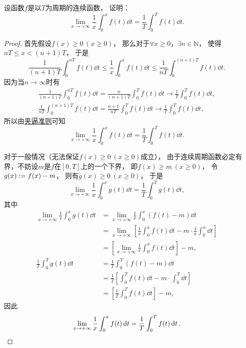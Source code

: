 \begin{example}
设函数\(f\)是以\(T\)为周期的连续函数，
证明：\begin{equation}\label{equation:定积分.周期函数的平均值的极限}
	\lim_{x\to+\infty} \frac1x \int_0^x f(t) \dd{t}
	= \frac1T \int_0^T f(t) \dd{t}.
\end{equation}
\begin{proof}
首先假设\(f(x)\geq0\ (x\geq0)\)，
那么对于\(\forall x\geq0\)，\(\exists n\in\mathbb{N}\)，
使得\(nT \leq x < (n+1)T\)，
于是\[
	\frac1{(n+1)T} \int_0^{nT} f(t) \dd{t}
	\leq \frac1x \int_0^x f(t) \dd{t}
	\leq \frac1{nT} \int_0^{(n+1)T} f(t) \dd{t}.
\]
因为当\(n\to\infty\)时有\begin{gather*}
	\frac1{(n+1)T} \int_0^{nT} f(t) \dd{t}
	= \frac{n}{(n+1)T} \int_0^T f(t) \dd{t}
	\to \frac1T \int_0^T f(t) \dd{t}, \\
	\frac1{nT} \int_0^{(n+1)T} f(t) \dd{t}
	= \frac{n+1}{nT} \int_0^T f(t) \dd{t}
	\to \frac1T \int_0^T f(t) \dd{t},
\end{gather*}
所以由\hyperref[theorem:函数极限.夹逼准则]{夹逼准则}可知\[
	\lim_{x\to+\infty} \frac1x \int_0^x f(t) \dd{t}
	= \frac1T \int_0^T f(t) \dd{t}.
\]

对于一般情况（无法保证\(f(x)\geq0\ (x\geq0)\)成立），
由于连续周期函数必定有界，不妨设\(m\)是\(f\)在\([0,T]\)上的一个下界，
即\(f(x) \geq m\ (x\geq0)\)，
令\(g(x) := f(x) - m\)，
则有\(g(x)\geq0\ (x\geq0)\)，
于是\[
	\lim_{x\to+\infty} \frac1x \int_0^x g(t) \dd{t}
	= \frac1T \int_0^T g(t) \dd{t},
\]
其中\begin{align*}
	\lim_{x\to+\infty} \frac1x \int_0^x g(t) \dd{t}
	&= \lim_{x\to+\infty} \frac1x \int_0^x (f(t) - m) \dd{t} \\
	&= \lim_{x\to+\infty} \left[
		\frac1x \int_0^x f(t) \dd{t}
		- m \cdot \frac1x \int_0^x \dd{t}
	\right] \\
	&= \left[ \lim_{x\to+\infty} \frac1x \int_0^x f(t) \dd{t} \right] - m, \\
	\frac1T \int_0^T g(t) \dd{t}
	&= \frac1T \int_0^T (f(t) - m) \dd{t} \\
	&= \frac1T \left[
		\int_0^T f(t) \dd{t}
		- m \cdot \int_0^T \dd{t}
	\right] \\
	&= \left[ \frac1T \int_0^T f(t) \dd{t} \right] - m,
\end{align*}
因此\[
	\lim_{x\to+\infty} \frac1x \int_0^x f(t) \dd{t}
	= \frac1T \int_0^T f(t) \dd{t}.
	\qedhere
\]
\end{proof}
\end{example}

